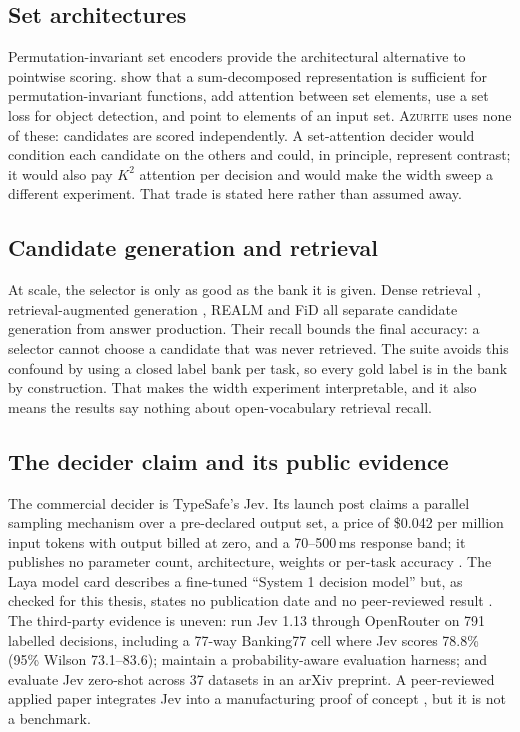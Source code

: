 \subsection{Set architectures}

Permutation-invariant set encoders provide the architectural alternative to
pointwise scoring. \citet{zaheer2017deep} show that a sum-decomposed representation
is sufficient for permutation-invariant functions, \citet{lee2018set} add
attention between set elements, \citet{carion2020detr} use a set loss for object
detection, and \citet{vinyals2015pointer} point to elements of an input set.
\textsc{Azurite} uses none of these: candidates are scored independently. A
set-attention decider would condition each candidate on the others and could, in
principle, represent contrast; it would also pay $K^2$ attention per decision and
would make the width sweep a different experiment. That trade is stated here
rather than assumed away.

\subsection{Candidate generation and retrieval}

At scale, the selector is only as good as the bank it is given. Dense retrieval
\citep{karpukhin2020dpr}, retrieval-augmented generation \citep{lewis2020rag},
REALM \citep{guu2020realm} and FiD \citep{izacard2020fid} all separate candidate
generation from answer production. Their recall bounds the final accuracy: a
selector cannot choose a candidate that was never retrieved. The suite avoids
this confound by using a closed label bank per task, so every gold label is in the
bank by construction. That makes the width experiment interpretable, and it also
means the results say nothing about open-vocabulary retrieval recall.

\subsection{The decider claim and its public evidence}

The commercial decider is TypeSafe's Jev. Its launch post claims a parallel
sampling mechanism over a pre-declared output set, a price of \$0.042 per million
input tokens with output billed at zero, and a 70--500\,ms response band; it
publishes no parameter count, architecture, weights or per-task accuracy
\citep{typesafe2026jev}. The Laya model card describes a fine-tuned ``System 1
decision model'' but, as checked for this thesis, states no publication date and
no peer-reviewed result \citep{laya2026card}. The third-party evidence is uneven:
\citet{ayautomate2026jev} run Jev 1.13 through OpenRouter on 791 labelled
decisions, including a 77-way Banking77 cell where Jev scores 78.8\% (95\% Wilson
73.1--83.6); \citet{abdelstark2026jev} maintain a probability-aware evaluation
harness; and \citet{bonn2026jev} evaluate Jev zero-shot across 37 datasets in an
arXiv preprint. A peer-reviewed applied paper integrates Jev into a manufacturing
proof of concept \citep{vodilka2026jev}, but it is not a benchmark.

